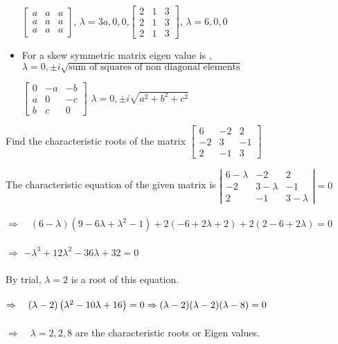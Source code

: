 \begin{itemize}
\begin{example}
		$\left[\begin{array}{ccc}a & a & a \\ a & a & a \\ a & a & a\end{array}\right]$, $ \lambda=3a,0,0$,$\left[\begin{array}{ccc}2 & 1 & 3 \\ 2 & 1 & 3 \\ 2 & 1 & 3\end{array}\right]$, $ \lambda=6,0,0$
\end{example}
\item For a skew symmetric matrix eigen value is , $\lambda= 0,\pm i\sqrt {\text{sum of squares of non diagonal elements}}$
\begin{example}
$\left[\begin{array}{ccc}0 & -a & -b \\ a & 0 & -c \\ b & c & 0\end{array}\right]$ $ \lambda=0,\pm i\sqrt{a^{2}+b^{2}+c^{2}}$	
\end{example}

\end{itemize}
\begin{exercise}
	 Find the characteristic roots of the matrix $\left[\begin{array}{rrr}6 & -2 & 2 \\ -2 & 3 & -1 \\ 2 & -1 & 3\end{array}\right]$ \end{exercise}
 \begin{answer}
 	 The characteristic equation of the given matrix is $\left|\begin{array}{rrr}6-\lambda & -2 & 2 \\ -2 & 3-\lambda & -1 \\ 2 & -1 & 3-\lambda\end{array}\right|=0$
 	\\\\$\Rightarrow \quad(6-\lambda)\left(9-6 \lambda+\lambda^{2}-1\right)+2(-6+2 \lambda+2)+2(2-6+2 \lambda)=0$
 	\\\\	$\Rightarrow$
 	$-\lambda^{3}+12 \lambda^{2}-36 \lambda+32=0$
 	\\\\By trial, $\lambda=2$ is a root of this equation. \\\\$\Rightarrow \quad(\lambda-2)\left(\lambda^{2}-10 \lambda+16\right)=0 \\\\\Rightarrow(\lambda-2)(\lambda-2)(\lambda-8)=0$
 	\\\\$\Rightarrow \quad \lambda=2,2,8$ are the characteristic roots or Eigen values.
 	
 \end{answer}
 
